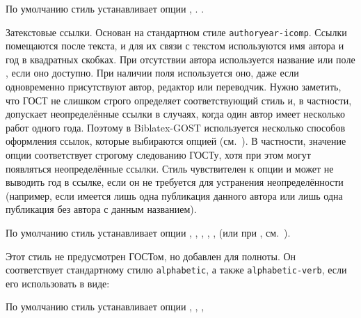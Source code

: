 \documentclass[10pt,a4paper,headings=small,numbers=enddot,english,russian]{ltxdockit}
\newcommand*{\biblatexgost}{Biblatex-GOST\xspace}
\newcommand*{\bibsty}{\texttt}
\begin{document}
\begin{marglist}
По умолчанию стиль устанавливает опции , .
.

\item[gost-authoryear]
Затекстовые ссылки. Основан на стандартном
стиле \bibsty{authoryear-icomp}. Ссылки помещаются после текста, и для их связи
с текстом используются имя автора и год в квадратных скобках. 
При отсутствии автора
используется название или поле , если оно доступно.
При наличии поля  используется оно, даже если одновременно присутствуют
автор, редактор или переводчик. Нужно заметить, что ГОСТ
не слишком строго определяет соответствующий стиль и, в частности, допускает неопределённые
ссылки в случаях, когда один автор имеет несколько
работ одного года. Поэтому в \biblatexgost используется несколько способов оформления
ссылок, которые выбираются опцией  (см.~).
В частности, значение опции  соответствует строгому
следованию ГОСТу, хотя при этом могут появляться неопределённые ссылки.
  Стиль чувствителен к опции  и может не выводить
  год в ссылке, если он не требуется для устранения неопределённости (например, если
  имеется лишь одна публикация данного автора или лишь одна публикация без автора с данным
  названием).

По умолчанию стиль устанавливает опции
,
,
,
,
,
(или  при ,
см.~).

\item[gost-alphabetic]
Этот стиль не предусмотрен ГОСТом, но добавлен для полноты. Он соответствует стандартному
стилю \bibsty{alphabetic}, а также \bibsty{alphabetic-verb}, если его использовать в виде:

\begin{ltxcode}
\usepackage[%
    citestyle=alphabetic-verb,
    bibstyle=gost-alphabetic,
    ...
]{biblatex}
\end{ltxcode}

По умолчанию стиль устанавливает опции
,
,
,


\end{marglist}
\end{document}
